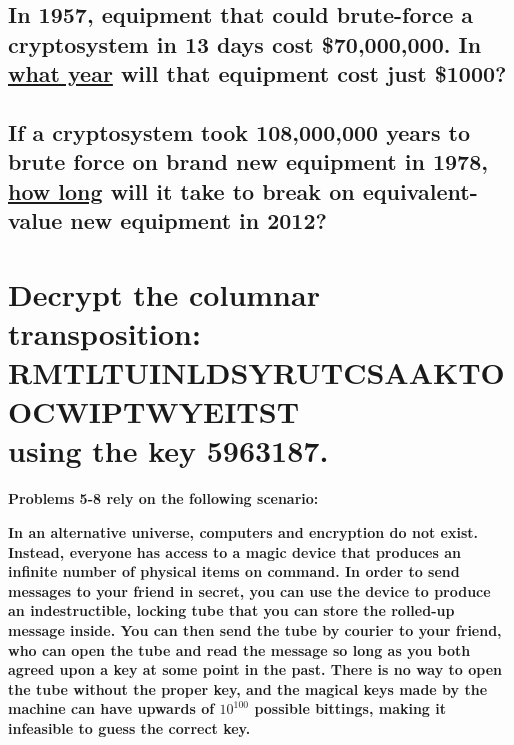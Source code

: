 \documentclass[12pt]{article}
\begin{document}
\newpage

\subsection{In 1957, equipment that could brute-force a cryptosystem in 13 days cost \$70,000,000.  In \underline{what year} will that equipment cost just \$1000?}

\vspace{9cm}

\subsection{If a cryptosystem took 108,000,000 years to brute force on brand new equipment in 1978, \underline{how long} will it take to break on equivalent-value new equipment in 2012?}

\newpage

\section{Decrypt the columnar transposition: \\ RMTLTUINLDSYRUTCSAAKTOOCWIPTWYEITST \\ using the key 5963187.}

\vspace{9cm}

\textbf{Problems 5-8 rely on the following scenario:}

\textbf{In an alternative universe, computers and encryption do not exist.  Instead, everyone has access to a magic device that produces an infinite number of physical items on command.  In order to send messages to your friend in secret, you can use the device to produce an indestructible, locking tube that you can store the rolled-up message inside.  You can then send the tube by courier to your friend, who can open the tube and read the message so long as you both agreed upon a key at some point in the past.  There is no way to open the tube without the proper key, and the magical keys made by the machine can have upwards of $10^{100}$ possible bittings, making it infeasible to guess the correct key.}
\end{document}
